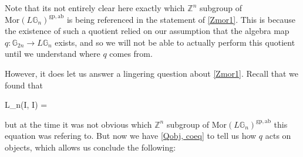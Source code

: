 Note that its not entirely clear here exactly which $\mathbb{Z}^n$ subgroup of $\mathrm{Mor}(L\mathbb{G}_n)^{\mathrm{gp, ab}}$ is being referenced in the statement of \cref{Zmor1}. This is because the existence of such a quotient relied on our assumption that the algebra map $q: \mathbb{G}_{2n} \to L\mathbb{G}_n$ exists, and so we will not be able to actually perform this quotient until we understand where $q$ comes from.





However, it does let us answer a lingering question about \cref{Zmor1}. Recall that we found that
\begin{eq*} L_n(I, I) \quad = \quad {} \end{eq*}
but at the time it was not obvious which $\mathbb{Z}^n$ subgroup of ${\mathrm{Mor}(L\mathbb{G}_n)}^{\mathrm{gp, ab}}$ this equation was refering to.  But now we have \cref{Qobj, coeq} to tell us how $q$ acts on objects, which allows us conclude the following:


